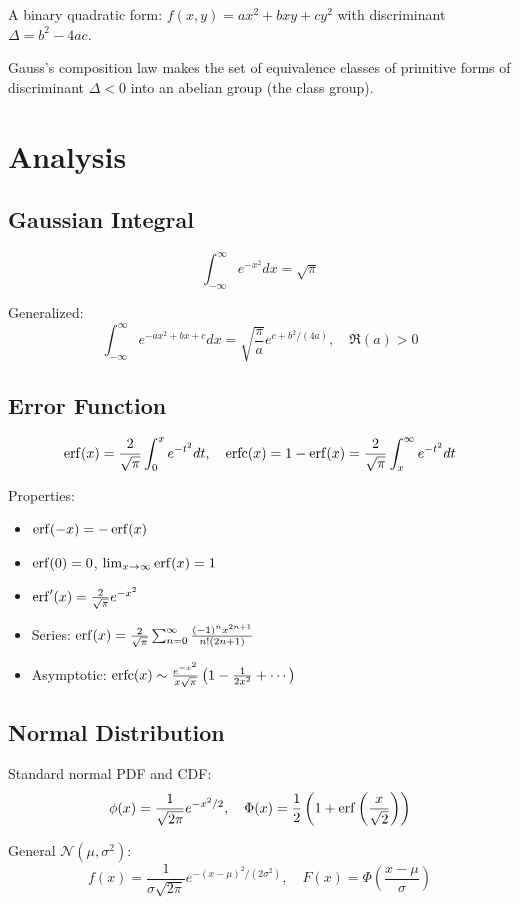 A binary quadratic form: $f(x,y) = ax^2 + bxy + cy^2$ with discriminant $\Delta = b^2 - 4ac$.

Gauss's composition law makes the set of equivalence classes of primitive forms of discriminant $\Delta < 0$ into an abelian group (the class group).

\section{Analysis}

\subsection{Gaussian Integral}

\[
\int_{-\infty}^{\infty} e^{-x^2} dx = \sqrt{\pi}
\]

Generalized:
\[
\int_{-\infty}^{\infty} e^{-ax^2+bx+c} dx = \sqrt{\frac{\pi}{a}} e^{c + b^2/(4a)}, \quad \Re(a) > 0
\]

\subsection{Error Function}

\[
\operatorname{erf}(x) = \frac{2}{\sqrt{\pi}} \int_0^x e^{-t^2} dt, \quad
\operatorname{erfc}(x) = 1 - \operatorname{erf}(x) = \frac{2}{\sqrt{\pi}} \int_x^{\infty} e^{-t^2} dt
\]

Properties:
\begin{itemize}
    \item $\operatorname{erf}(-x) = -\operatorname{erf}(x)$
    \item $\operatorname{erf}(0) = 0$, $\lim_{x\to\infty} \operatorname{erf}(x) = 1$
    \item $\operatorname{erf}'(x) = \frac{2}{\sqrt{\pi}} e^{-x^2}$
    \item Series: $\operatorname{erf}(x) = \frac{2}{\sqrt{\pi}} \sum_{n=0}^{\infty} \frac{(-1)^n x^{2n+1}}{n!(2n+1)}$
    \item Asymptotic: $\operatorname{erfc}(x) \sim \frac{e^{-x^2}}{x\sqrt{\pi}}\left(1 - \frac{1}{2x^2} + \cdots\right)$
\end{itemize}

\subsection{Normal Distribution}

Standard normal PDF and CDF:
\[
\phi(x) = \frac{1}{\sqrt{2\pi}} e^{-x^2/2}, \quad
\Phi(x) = \frac{1}{2}\left(1 + \operatorname{erf}\left(\frac{x}{\sqrt{2}}\right)\right)
\]

General $\mathcal{N}(\mu, \sigma^2)$:
\[
f(x) = \frac{1}{\sigma\sqrt{2\pi}} e^{-(x-\mu)^2/(2\sigma^2)}, \quad
F(x) = \Phi\left(\frac{x-\mu}{\sigma}\right)
\]

